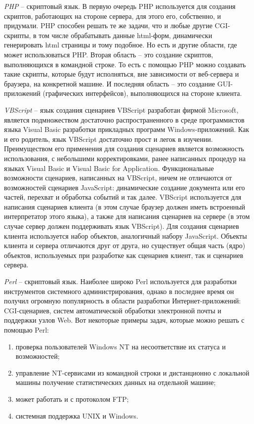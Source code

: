 {\itshape PHP } -- скриптовый язык. В первую очередь PHP используется для создания скриптов, работающих на стороне сервера, для этого его, собственно, и придумали. PHP способен решать те же задачи, что и любые другие CGI-скрипты, в том числе обрабатывать данные html-форм, динамически генерировать html страницы и тому подобное. Но есть и другие области, где может использоваться PHP.
Вторая область – это создание скриптов, выполняющихся в командной строке. То есть с помощью PHP можно создавать такие скрипты, которые будут исполняться, вне зависимости от веб-сервера и браузера, на конкретной машине.
И последняя область – это создание GUI-приложений (графических интерфейсов), выполняющихся на стороне клиента\cite{php}.

{\itshape VBScript} -- язык создания сценариев VBScript разработан фирмой Microsoft, является подмножеством достаточно распространенного в среде программистов языка Visual Basic разработки прикладных программ Windows-приложений. Как и его родитель, язык VBScript достаточно прост и легок в изучении.
Преимуществом его применения для создания сценариев является возможность использования, с небольшими корректировками, ранее написанных процедур на языках Visual Basic и Visual Basic for Application.
Функциональные возможности сценариев, написанных на VBScript, ничем не отличаются от возможностей сценариев JavaScript: динамические создание документа или его частей, перехват и обработка событий и так далее.
VBScript используется для написания сценариев клиента (в этом случае браузер должен иметь встроенный интерпретатор этого языка), а также для написания сценариев на сервере (в этом случае сервер должен поддерживать язык VBScript).
Для создания сценариев клиента используется набор объектов, аналогичный набору JavaScript. Объекты клиента и сервера отличаются друг от друга, но существует общая часть (ядро) объектов, используемых при разработке как сценариев клиент, так и сценариев сервера\cite{VBS}.

{\itshape Perl} -- скриптовый язык. Наиболее широко Perl используется для разработки инструментов системного администрирования, однако в последнее время он получил огромную популярность в области разработки Интернет-приложений: CGI-сценариев, систем автоматической обработки электронной почты и поддержки узлов Web\cite{perl}.
Вот некоторые примеры задач, которые можно решать с помощью Perl:
\begin{enumerate}
\item проверка пользователей Windows NT на несоответствие их статуса и возможностей;
\item управление NT-сервисами из командной строки и дистанционно с локальной машины получение статистических данных на отдельной машине;
\item может работать и с протоколом FTP;
\item системная поддержка UNIX и Windows.
\end{enumerate}

